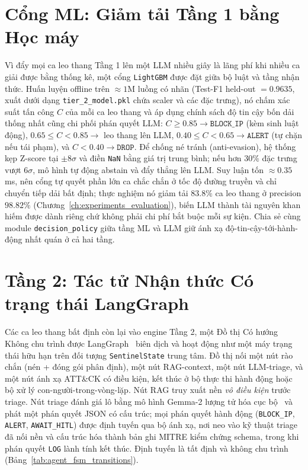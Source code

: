 \section{Cổng ML: Giảm tải Tầng 1 bằng Học máy}
Vì đẩy mọi ca leo thang Tầng 1 lên một LLM nhiều giây là lãng phí khi nhiều ca giải được bằng thống kê, một cổng \texttt{LightGBM} được đặt giữa bộ luật và tầng nhận thức. Huấn luyện offline trên $\approx\!1$M luồng có nhãn (Test-F1 held-out $=0.9635$, xuất dưới dạng \texttt{tier\_2\_model.pkl} chứa scaler và các đặc trưng), nó chấm xác suất tấn công $C$ của mỗi ca leo thang và áp dụng chính sách độ tin cậy bốn dải thống nhất cũng chi phối phán quyết LLM: $C\!\ge\!0.85\rightarrow\texttt{BLOCK\_IP}$ (kèm sinh luật động), $0.65\!\le\!C\!<\!0.85\rightarrow$ leo thang lên LLM, $0.40\!\le\!C\!<\!0.65\rightarrow\texttt{ALERT}$ (tự chặn nếu tái phạm), và $C\!<\!0.40\rightarrow\texttt{DROP}$. Để chống né tránh (anti-evasion), hệ thống kẹp Z-score tại $\pm8\sigma$ và điền \texttt{NaN} bằng giá trị trung bình; nếu hơn $30\%$ đặc trưng vượt $6\sigma$, mô hình tự động abstain và đẩy thẳng lên LLM. Suy luận tốn $\approx\!0.35$\,ms, nên cổng tự quyết phần lớn ca chắc chắn ở tốc độ đường truyền và chỉ chuyển tiếp dải bất định; thực nghiệm nó giảm tải $83.8\%$ ca leo thang ở precision $98.82\%$ (Chương~\ref{ch:experiments_evaluation}), biến LLM thành tài nguyên khan hiếm được dành riêng chứ không phải chi phí bắt buộc mỗi sự kiện. Chia sẻ cùng module \texttt{decision\_policy} giữa tầng ML và LLM giữ ánh xạ độ-tin-cậy-tới-hành-động nhất quán ở cả hai tầng.

\section{Tầng 2: Tác tử Nhận thức Có trạng thái LangGraph}
Các ca leo thang bất định còn lại vào engine Tầng 2, một Đồ thị Có hướng Không chu trình được LangGraph~\cite{langgraph2024} biên dịch và hoạt động như một máy trạng thái hữu hạn trên đối tượng \texttt{SentinelState} trung tâm. Đồ thị nối một nút rào chắn (nén + đóng gói phân định), một nút RAG-context, một nút LLM-triage, và một nút ánh xạ ATT\&CK có điều kiện, kết thúc ở bộ thực thi hành động hoặc bộ xử lý con-người-trong-vòng-lặp. Nút RAG truy xuất nền \emph{vô điều kiện} trước triage. Nút triage đánh giá lô bằng mô hình Gemma-2 lượng tử hóa cục bộ~\cite{gemma_2_2024} và phát một phán quyết JSON có cấu trúc; mọi phán quyết hành động (\texttt{BLOCK\_IP}, \texttt{ALERT}, \texttt{AWAIT\_HITL}) được định tuyến qua bộ ánh xạ, nơi neo vào kỹ thuật triage đã nối nền và cấu trúc hóa thành bản ghi MITRE kiểm chứng schema, trong khi phán quyết \texttt{LOG} lành tính kết thúc. Định tuyến là tất định và không chu trình (Bảng~\ref{tab:agent_fsm_transitions}).

